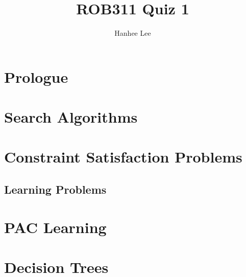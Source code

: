\documentclass{article}
\title{ROB311 Quiz 1}
\author{Hanhee Lee}
\begin{document}
\maketitle

\tableofcontents
\newpage

\section{Prologue}

\newpage

\section{Search Algorithms}

\newpage

\section{Constraint Satisfaction Problems}

\newpage

\begin{center}
    \section*{Learning Problems}
\end{center}

\newpage

\section{PAC Learning}

\newpage

\section{Decision Trees}

\end{document}
